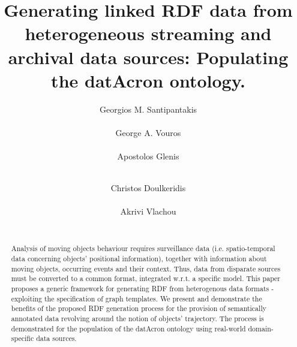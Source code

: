 \documentclass{sig-alternate}
\begin{document}
\title{Generating linked RDF data from heterogeneous streaming and archival data sources: Populating the datAcron ontology.}

\author{
\alignauthor
Georgios M. Santipantakis\\
\\
\alignauthor
George A. Vouros\\
\\
\alignauthor
Apostolos Glenis\\
\\
\and
\alignauthor
Christos Doulkeridis\\
\\
\alignauthor
Akrivi Vlachou\\
\\
}
\maketitle

\begin{abstract}
Analysis of moving objects behaviour requires surveillance data (i.e. spatio-temporal data concerning objects' positional information), together with information about moving objects, occurring events and their context. Thus, data from disparate sources must be converted to a common format, integrated w.r.t. a specific model. This paper proposes a generic framework for generating RDF from heterogenous data formats - exploiting the specification of graph templates. We present and demonstrate the benefits of the proposed RDF generation process for the provision of semantically annotated data revolving around the notion of objects' trajectory. The process is demonstrated for the population of the datAcron ontology using real-world domain-specific data sources.
\end{abstract}
\end{document}
